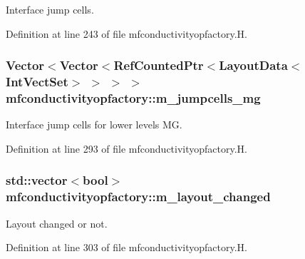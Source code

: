 Interface jump cells. 



Definition at line 243 of file mfconductivityopfactory.\+H.

\subsubsection[{\texorpdfstring{m\+\_\+jumpcells\+\_\+mg}{m_jumpcells_mg}}]{\setlength{\rightskip}{0pt plus 5cm}Vector$<$Vector$<$Ref\+Counted\+Ptr$<$Layout\+Data$<$Int\+Vect\+Set$>$ $>$ $>$ $>$ mfconductivityopfactory\+::m\+\_\+jumpcells\+\_\+mg\hspace{0.3cm}{\ttfamily [protected]}}\hypertarget{classmfconductivityopfactory_ac9aae38ad35d66ac066694de865d8909}{}\label{classmfconductivityopfactory_ac9aae38ad35d66ac066694de865d8909}


Interface jump cells for lower levels MG. 



Definition at line 293 of file mfconductivityopfactory.\+H.

\subsubsection[{\texorpdfstring{m\+\_\+layout\+\_\+changed}{m_layout_changed}}]{\setlength{\rightskip}{0pt plus 5cm}std\+::vector$<$bool$>$ mfconductivityopfactory\+::m\+\_\+layout\+\_\+changed\hspace{0.3cm}{\ttfamily [protected]}}\hypertarget{classmfconductivityopfactory_ae828f9e97aa905eb22fccbe48e45838c}{}\label{classmfconductivityopfactory_ae828f9e97aa905eb22fccbe48e45838c}


Layout changed or not. 



Definition at line 303 of file mfconductivityopfactory.\+H.


